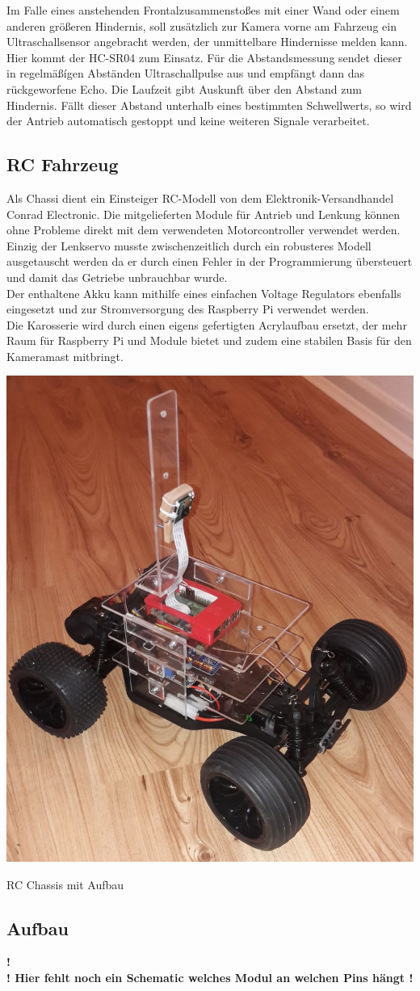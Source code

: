     \vspace{1cm}
    Im Falle eines anstehenden Frontalzusammenstoßes mit einer Wand oder einem
    anderen größeren Hindernis, soll zusätzlich zur Kamera vorne am Fahrzeug ein
    Ultraschallsensor angebracht werden, der unmittelbare Hindernisse melden
    kann. Hier kommt der HC-SR04 zum Einsatz. Für die Abstandsmessung sendet
    dieser in regelmäßígen Abständen Ultraschallpulse aus und empfängt dann das
    rückgeworfene Echo. Die Laufzeit gibt Auskunft über den Abstand zum
    Hindernis. Fällt dieser Abstand unterhalb eines bestimmten Schwellwerts, so
    wird der Antrieb automatisch gestoppt und keine weiteren Signale
    verarbeitet.

  \subsection{RC Fahrzeug}

    Als Chassi dient ein Einsteiger RC-Modell von dem Elektronik-Versandhandel
    Conrad Electronic. Die mitgelieferten Module für Antrieb und Lenkung können
    ohne Probleme direkt mit dem verwendeten Motorcontroller verwendet werden.
    Einzig der Lenkservo musste zwischenzeitlich durch ein robusteres Modell 
    ausgetauscht werden da er durch einen Fehler in der Programmierung
    übersteuert und damit das Getriebe unbrauchbar wurde. \\
    Der enthaltene Akku kann mithilfe eines einfachen Voltage Regulators
    ebenfalls eingesetzt und zur Stromversorgung des Raspberry Pi verwendet
    werden. \\
    Die Karosserie wird durch einen eigens gefertigten Acrylaufbau ersetzt, der
    mehr Raum für Raspberry Pi und Module bietet und zudem eine stabilen Basis
    für den Kameramast mitbringt.
    \ \\
    \begin{minipage}{\columnwidth}
      \makeatletter
      \def\@captype{figure}
      \makeatother
      \centering
      \includegraphics[width=0.6\linewidth]{images/hw_setup.jpg}
      \caption{RC Chassis mit Aufbau}
      \label{fig:img-hw-05}
    \end{minipage}
    \vspace{1cm}

  \subsection{Aufbau}
  \textbf{!\\! Hier fehlt noch ein Schematic welches Modul an welchen Pins hängt !}
